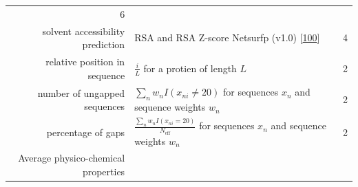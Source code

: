 \documentclass[12pt,a4paper,twoside]{book}
\theoremstyle{definition}
\theoremstyle{definition}
\theoremstyle{remark}
\begin{document}
\begin{longtable}[]{@{}rlc@{}}
\begin{minipage}[t]{0.18\columnwidth}
6\strut
\end{minipage}\tabularnewline
\begin{minipage}[t]{0.23\columnwidth}\raggedleft\strut
solvent accessibility prediction\strut
\end{minipage} & \begin{minipage}[t]{0.50\columnwidth}\raggedright\strut
RSA and RSA Z-score Netsurfp (v1.0)
{[}\protect\hyperlink{ref-Petersen2009a}{100}{]}\strut
\end{minipage} & \begin{minipage}[t]{0.18\columnwidth}\centering\strut
4\strut
\end{minipage}\tabularnewline
\begin{minipage}[t]{0.23\columnwidth}\raggedleft\strut
relative position in sequence\strut
\end{minipage} & \begin{minipage}[t]{0.50\columnwidth}\raggedright\strut
\(\frac{i}{L}\) for a protien of length \(L\)\strut
\end{minipage} & \begin{minipage}[t]{0.18\columnwidth}\centering\strut
2\strut
\end{minipage}\tabularnewline
\begin{minipage}[t]{0.23\columnwidth}\raggedleft\strut
number of ungapped sequences\strut
\end{minipage} & \begin{minipage}[t]{0.50\columnwidth}\raggedright\strut
\(\sum_n w_n I(x_{ni} \neq 20)\) for sequences \(x_n\) and sequence
weights \(w_n\)\strut
\end{minipage} & \begin{minipage}[t]{0.18\columnwidth}\centering\strut
2\strut
\end{minipage}\tabularnewline
\begin{minipage}[t]{0.23\columnwidth}\raggedleft\strut
percentage of gaps\strut
\end{minipage} & \begin{minipage}[t]{0.50\columnwidth}\raggedright\strut
\(\frac{\sum_n w_n I(x_{ni} = 20)}{N_{\text{eff}}}\) for sequences
\(x_n\) and sequence weights \(w_n\)\strut
\end{minipage} & \begin{minipage}[t]{0.18\columnwidth}\centering\strut
2\strut
\end{minipage}\tabularnewline
\begin{minipage}[t]{0.23\columnwidth}\raggedleft\strut
Average physico-chemical properties\strut

\end{minipage}
\end{longtable}
\end{document}
